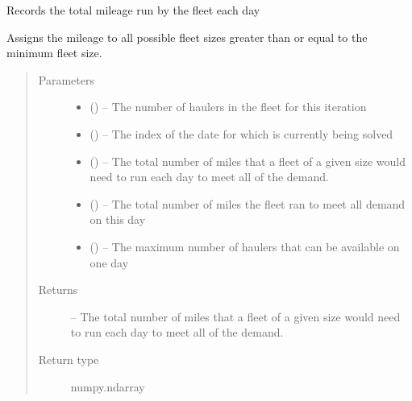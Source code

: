 \documentclass[letterpaper,10pt,english]{sphinxmanual}
\begin{document}
\begin{fulllineitems}
\label{\detokenize{daily-routing:recording.record_fleet_mileage}}
Records the total mileage run by the fleet each day

Assigns the mileage to all possible fleet sizes greater than or equal to
the minimum fleet size.
\begin{quote}\begin{description}
\item[{Parameters}] \leavevmode\begin{itemize}
\item {} 
 () -- The number of haulers in the fleet for this iteration

\item {} 
 () -- The index of the date for which is currently being solved

\item {} 
 () -- The total number of miles that a fleet of a given size would need to
run each day to meet all of the demand.

\item {} 
 () -- The total number of miles the fleet ran to meet all demand on this day

\item {} 
 () -- The maximum number of haulers that can be available on one day

\end{itemize}

\item[{Returns}] \leavevmode
{} -- The total number of miles that a fleet of a given size would need to
run each day to meet all of the demand.

\item[{Return type}] \leavevmode
numpy.ndarray

\end{description}\end{quote}

\end{fulllineitems}
\end{document}
